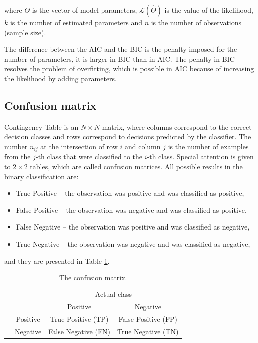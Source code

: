 \documentclass[english]{pwr_wmat_praca_dyplomowa}
\theoremstyle{plain}
\theoremstyle{definition}
\numberwithin{theorem}{chapter}
\begin{document}
\noindent where $\Theta$ is the vector of model parameters, $\mathcal{L}(\hat{\Theta})$ is the value of the likelihood, $k$ is the number of estimated parameters and $n$ is the number of observations (sample size). 

The difference between the AIC and the BIC is the penalty imposed for the number of parameters, it is larger in BIC than in AIC. The penalty in BIC resolves the problem of overfitting, which is possible in AIC because of increasing the likelihood by adding parameters.

\subsection{Confusion matrix}

Contingency Table is an $N \times N$ matrix, where columns correspond to the correct decision classes and rows correspond to decisions predicted by the classifier. The number $n_{ij}$ at the intersection of row $i$ and column $j$ is the number of examples from the $j$-th class that were classified to the $i$-th class. Special attention is given to $2 \times 2$ tables, which are called confusion matrices. All possible results in the binary classification are:

\begin{itemize}
	\item True Positive -- the observation was positive and was classified as positive,
	\item False Positive -- the observation was negative and was classified as positive,
	\item False Negative -- the observation was positive and was classified as negative,
	\item True Negative -- the observation was negative and was classified as negative,
\end{itemize}

\noindent and they are presented in Table \ref{tab:confusion_matrix}.

\begin{table}[H]
	\centering
	\begin{tabular}{c c | c | c} 
		 & & \multicolumn{2}{c}{Actual class} \\
		 & & Positive & Negative \\
		 \hline
		 {\rule{0pt}{3ex}} \multirow{2}{*}{Predicted class} & Positive & True Positive (TP) & False Positive (FP) \\\cmidrule{2-4}
		 & Negative & False Negative (FN) & True Negative (TN)  \\
	\end{tabular}
	\caption{The confusion matrix.}
	\label{tab:confusion_matrix} 
\end{table}
\end{document}
